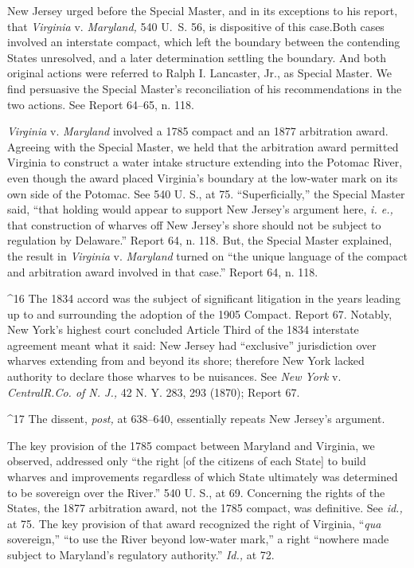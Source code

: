 {{  New Jersey urged before the Special Master, and in its exceptions
to his report, that \emph{Virginia} v. \emph{Maryland,} 540 U.~S. 56,
is dispositive of this case.\footnotemark[17] Both cases involved an interstate
compact, which left the boundary between the contending States
unresolved, and a later determination settling the boundary. And both
original actions were referred to Ralph I. Lancaster, Jr., as Special
Master. We find persuasive the Special Master's reconciliation of his
recommendations in the two actions. See Report 64--65, n. 118.

  \emph{Virginia} v. \emph{Maryland} involved a 1785 compact and an 1877
arbitration award. Agreeing with the Special Master, we held that
the arbitration award permitted Virginia to construct a water intake
structure extending into the Potomac River, even though the award
placed Virginia's boundary at the low-water mark on its own side
of the Potomac. See 540 U. S., at 75. ``Superficially,'' the
Special Master said, ``that holding would appear to support New
Jersey's argument here, \emph{i. e.,} that construction of wharves off
New Jersey's shore should not be subject to regulation by Delaware.''
Report 64, n. 118. But, the Special Master explained, the result in
\emph{Virginia} v. \emph{Maryland} turned on ``the unique language of the
compact and arbitration award involved in that case.'' Report 64, n.
118.\newpage 

^16 The 1834 accord was the subject of significant litigation in the
years leading up to and surrounding the adoption of the 1905 Compact.
Report 67. Notably, New York's highest court concluded Article
Third of the 1834 interstate agreement meant what it said: New Jersey
had ``exclusive'' jurisdiction over wharves extending from and beyond
its shore; therefore New York lacked authority to declare those wharves
to be nuisances. See \emph{New York} v. \emph{CentralR.Co. of N. J.,} 42 N.
Y. 283, 293 (1870); Report 67.

^17 The dissent, \emph{post,} at 638--640, essentially repeats New
Jersey's argument.

  The key provision of the 1785 compact between Maryland and Virginia,
we observed, addressed only ``the right [of the citizens of each State]
to build wharves and improvements regardless of which State ultimately
was determined to be sovereign over the River.'' 540 U. S., at 69.
Concerning the rights of the States, the 1877 arbitration award, not the
1785 compact, was definitive. See \emph{id.,} at 75. The key provision
of that award recognized the right of Virginia, ``\emph{qua} sovereign,''
``to use the River beyond low-water mark,'' a right ``nowhere made
subject to Maryland's regulatory authority.'' \emph{Id.,} at 72.

}}
